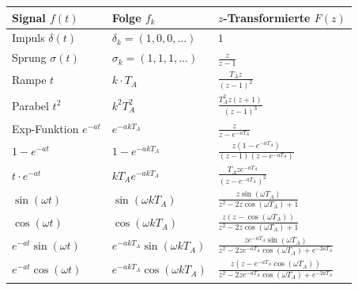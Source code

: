 \begin{tcolorbox}
\small
\begin{tabularx}{\columnwidth}{l X l}
\toprule
\textbf{Signal $f(t)$} & \textbf{Folge $f_k$} & \textbf{$z$-Transformierte $F(z)$} \\
\midrule
Impuls $\delta(t)$ & $\delta_k = (1, 0, 0, \dots)$ & $1$ \\[2pt]
Sprung $\sigma(t)$ & $\sigma_k = (1, 1, 1, \dots)$ & $\frac{z}{z-1}$ \\[3pt]
Rampe $t$ & $k \cdot T_A$ & $\frac{T_A z}{(z-1)^2}$ \\[3pt]
Parabel $t^2$ & $k^2 T_A^2$ & $\frac{T_A^2 z (z+1)}{(z-1)^3}$ \\[3pt]
Exp-Funktion $e^{-at}$ & $e^{-a k T_A}$ & $\frac{z}{z - e^{-a T_A}}$ \\[3pt]
$1 - e^{-at}$ & $1 - e^{-a k T_A}$ & $\frac{z (1 - e^{-a T_A})}{(z-1)(z - e^{-a T_A})}$ \\[3pt]
$t \cdot e^{-at}$ & $k T_A e^{-a k T_A}$ & $\frac{T_A z e^{-a T_A}}{(z - e^{-a T_A})^2}$ \\[3pt]
$\sin(\omega t)$ & $\sin(\omega k T_A)$ & $\frac{z \sin(\omega T_A)}{z^2 - 2z\cos(\omega T_A) + 1}$ \\[3pt]
$\cos(\omega t)$ & $\cos(\omega k T_A)$ & $\frac{z (z - \cos(\omega T_A))}{z^2 - 2z\cos(\omega T_A) + 1}$ \\[3pt]
$e^{-at}\sin(\omega t)$ & $e^{-ak T_A}\sin(\omega k T_A)$ & $\frac{z e^{-aT_A} \sin(\omega T_A)}{z^2 - 2z e^{-aT_A}\cos(\omega T_A) + e^{-2aT_A}}$ \\[3pt]
$e^{-at}\cos(\omega t)$ & $e^{-ak T_A}\cos(\omega k T_A)$ & $\frac{z (z - e^{-aT_A}\cos(\omega T_A))}{z^2 - 2z e^{-aT_A}\cos(\omega T_A) + e^{-2aT_A}}$ \\
\bottomrule
\end{tabularx}
\end{tcolorbox}

